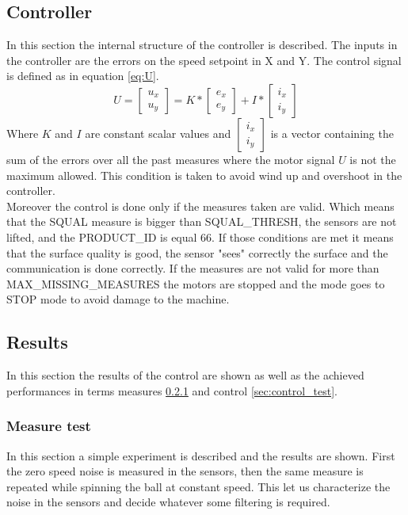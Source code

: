 \documentclass[12pt,a4paper, twoside]{article}
\begin{document}
\subsection{Controller} \label{sec:controller}
In this section the internal structure of the controller is described.
The inputs in the controller are the errors on the speed setpoint in X and Y. The control signal is defined as in equation \ref{eq:U}.
\begin{equation}\label{eq:U}
U = 
\begin{bmatrix}
u_x\\
u_y
\end{bmatrix}
= K * 
\begin{bmatrix}
e_x\\
e_y
\end{bmatrix} + I *
\begin{bmatrix}
i_x\\
i_y
\end{bmatrix} 
\end{equation}
Where $K$ and $I$ are constant scalar values and $\begin{bmatrix}i_x\\i_y\end{bmatrix}$ is a vector containing the sum of the errors over all the past measures where the motor signal $U$ is not the maximum allowed. This condition is taken to avoid wind up and overshoot in the controller.\\
Moreover the control is done only if the measures taken are valid. Which means that the SQUAL measure is bigger than SQUAL\_THRESH, the sensors are not lifted, and the PRODUCT\_ID is equal 66.
If those conditions are met it means that the surface quality is good, the sensor "sees" correctly the surface and the communication is done correctly.
If the measures are not valid for more than MAX\_MISSING\_MEASURES the motors are stopped and the mode goes to STOP mode to avoid damage to the machine.
\subsection{Results}
In this section the results of the control are shown as well as the achieved performances in terms measures \ref{sec:measure_test} and control \ref{sec:control_test}.
\subsubsection{Measure test}\label{sec:measure_test}
In this section a simple experiment is described and the results are shown. First the zero speed noise is measured in the sensors, then the same measure is repeated while spinning the ball at constant speed. This let us characterize the noise in the sensors and decide whatever some filtering is required.
\end{document}
